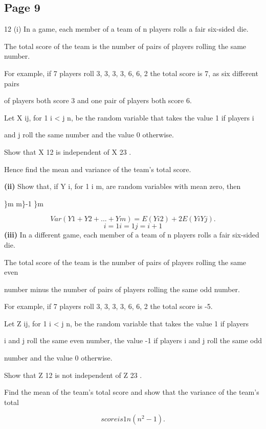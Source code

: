 \documentclass[12pt]{article}
\begin{document}
\subsection*{Page 9}
\begin{flushleft}
12 (i) In a game, each member of a team of n players rolls a fair six-sided die.\par
The total score of the team is the number of pairs of players rolling the same number.\par
For example, if 7 players roll 3, 3, 3, 3, 6, 6, 2 the total score is 7, as six different pairs\par
of players both score 3 and one pair of players both score 6.\par
Let X ij, for 1 \geq i < j \geq n, be the random variable that takes the value 1 if players i\par
and j roll the same number and the value 0 otherwise.\par
Show that X 12 is independent of X 23 .\par
Hence find the mean and variance of the team's total score.\par
\textbf{(ii)} Show that, if Y i, for 1 \geq i \geq m, are random variables with mean zero, then\par
\}m m\}-1 \}m\par
\[Var(Y 1 + Y 2 + . . . + Y m) = E(Y i 2 ) + 2 E(Y i Y j) .\]
\[i=1 i=1 j=i+1\]
\textbf{(iii)} In a different game, each member of a team of n players rolls a fair six-sided die.\par
The total score of the team is the number of pairs of players rolling the same even\par
number minus the number of pairs of players rolling the same odd number.\par
For example, if 7 players roll 3, 3, 3, 3, 6, 6, 2 the total score is -5.\par
Let Z ij, for 1 \geq i < j \geq n, be the random variable that takes the value 1 if players\par
i and j roll the same even number, the value -1 if players i and j roll the same odd\par
number and the value 0 otherwise.\par
Show that Z 12 is not independent of Z 23 .\par
Find the mean of the team's total score and show that the variance of the team's total\par
\[score is 1 n(n^2 - 1).\]
\end{flushleft}
\end{document}
